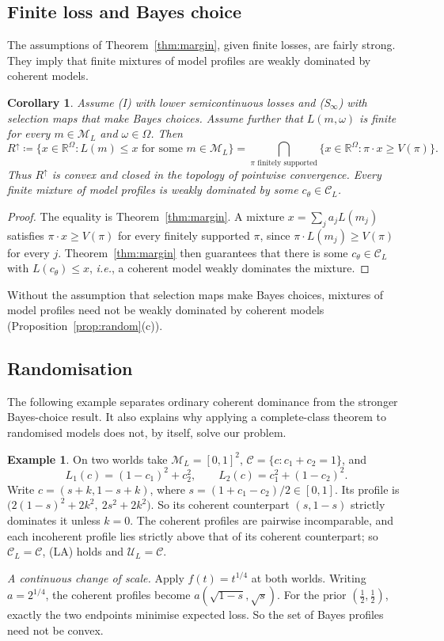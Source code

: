 \documentclass[11pt]{article}
\newtheorem{corollary}[theorem]{Corollary}
\theoremstyle{definition}
\newtheorem{example}[theorem]{Example}
\theoremstyle{remark}
\newcommand{\R}{\mathbb R}
\newcommand{\M}{\mathcal M}
\newcommand{\C}{\mathcal C}
\newcommand{\U}{\mathcal U}
\begin{document}
\subsection{Finite loss and Bayes choice}\label{sec:convexconsequence}
The assumptions of Theorem~\ref{thm:margin}, given finite losses, are fairly strong. They imply that finite mixtures of model profiles are weakly dominated by coherent models.


\begin{corollary}\label{cor:upperconvex}
Assume (I) with lower semicontinuous losses and (S$_\infty$) with selection maps that make Bayes choices. Assume further that $L(m,\omega)$ is finite for every $m\in\M_L$ and $\omega\in\Omega$. Then
\[
 R^\uparrow\coloneqq \{x\in\R^\Omega:L(m)\le x\text{ for some }m\in\M_L\}
 =\bigcap_{\pi\text{ finitely supported}}
 \{x\in\R^\Omega:\pi\cdot x\ge V(\pi)\}.
\]
Thus $R^\uparrow$ is convex and closed in the topology of pointwise convergence. Every finite mixture of model profiles is weakly dominated by some $c_\theta\in\C_L$.
\end{corollary}
\begin{proof}
The equality is Theorem~\ref{thm:margin}. A mixture $x=\sum_j a_jL(m_j)$ satisfies $\pi\cdot x\ge V(\pi)$ for every finitely supported $\pi$, since $\pi\cdot L(m_j)\ge V(\pi)$ for every $j$. Theorem~\ref{thm:margin} then guarantees that there is some $c_\theta\in\C_L$ with $L(c_\theta)\le x$, \textit{i.e.}, a coherent model weakly dominates the mixture.
\end{proof}
Without the assumption that selection maps make Bayes choices, mixtures of model profiles need not be weakly dominated by coherent models (Proposition~\ref{prop:random}(c)).

\subsection{Randomisation}\label{sec:random}
The following example separates ordinary coherent dominance from the stronger Bayes-choice result. It also explains why applying a complete-class theorem to randomised models does not, by itself, solve our problem.
\begin{example}\label{ex:rescale}
On two worlds take $\M_L=[0,1]^2$, $\C=\{c:c_1+c_2=1\}$, and
\[
 L_1(c)=(1-c_1)^2+c_2^2,\qquad L_2(c)=c_1^2+(1-c_2)^2.
\]
Write $c=(s+k,1-s+k)$, where $s=(1+c_1-c_2)/2\in[0,1]$. Its profile is $\bigl(2(1-s)^2+2k^2,\ 2s^2+2k^2\bigr)$. So its coherent counterpart $(s,1-s)$ strictly dominates it unless $k=0$. The coherent profiles are pairwise incomparable, and each incoherent profile lies strictly above that of its coherent counterpart; so $\C_L=\C$, (LA) holds and $\U_L=\C$.

\emph{A continuous change of scale.} Apply $f(t)=t^{1/4}$ at both worlds. Writing $a=2^{1/4}$, the coherent profiles become $a(\sqrt{1-s},\sqrt s)$. For the prior $(\tfrac12,\tfrac12)$, exactly the two endpoints minimise expected loss. So the set of Bayes profiles need not be convex.

\end{example}
\end{document}
